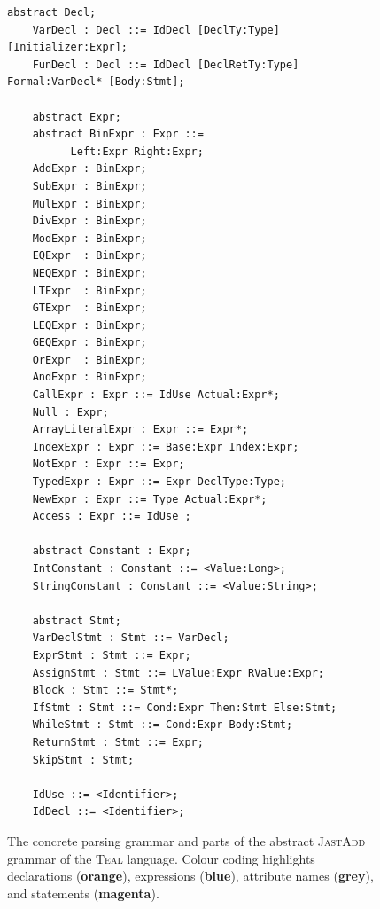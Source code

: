 \begin{figure}[H]
\begin{minipage}{0.8\textwidth}
\begin{lrbox}{\mylistingbox}
\begin{lstlisting}[language=ASTGrammar]
    abstract Decl;
    VarDecl : Decl ::= IdDecl [DeclTy:Type] [Initializer:Expr];
    FunDecl : Decl ::= IdDecl [DeclRetTy:Type] Formal:VarDecl* [Body:Stmt];

    abstract Expr;
    abstract BinExpr : Expr ::=
          Left:Expr Right:Expr;
    AddExpr : BinExpr;
    SubExpr : BinExpr;
    MulExpr : BinExpr;
    DivExpr : BinExpr;
    ModExpr : BinExpr;
    EQExpr  : BinExpr;
    NEQExpr : BinExpr;
    LTExpr  : BinExpr;
    GTExpr  : BinExpr;
    LEQExpr : BinExpr;
    GEQExpr : BinExpr;
    OrExpr  : BinExpr;
    AndExpr : BinExpr;
    CallExpr : Expr ::= IdUse Actual:Expr*;
    Null : Expr;
    ArrayLiteralExpr : Expr ::= Expr*;
    IndexExpr : Expr ::= Base:Expr Index:Expr;
    NotExpr : Expr ::= Expr;
    TypedExpr : Expr ::= Expr DeclType:Type;
    NewExpr : Expr ::= Type Actual:Expr*;
    Access : Expr ::= IdUse ;

    abstract Constant : Expr;
    IntConstant : Constant ::= <Value:Long>;
    StringConstant : Constant ::= <Value:String>;

    abstract Stmt;
    VarDeclStmt : Stmt ::= VarDecl;
    ExprStmt : Stmt ::= Expr;
    AssignStmt : Stmt ::= LValue:Expr RValue:Expr;
    Block : Stmt ::= Stmt*;
    IfStmt : Stmt ::= Cond:Expr Then:Stmt Else:Stmt;
    WhileStmt : Stmt ::= Cond:Expr Body:Stmt;
    ReturnStmt : Stmt ::= Expr;
    SkipStmt : Stmt;

    IdUse ::= <Identifier>;
    IdDecl ::= <Identifier>;
        \end{lstlisting}
\end{lrbox}
\scalebox{0.75}{\usebox{\mylistingbox}}

        \end{minipage}
\caption{\label{fig:tealGrammar} The concrete parsing grammar and parts of the abstract \textsc{JastAdd} grammar of the \textsc{Teal} language.
 Colour coding highlights declarations ({\bfseries\color{orange}orange}), expressions ({\bfseries\color{lightblue}blue}),
 attribute names ({\bfseries\color{CadetBlue}grey}), and statements ({\bfseries\color{magenta}magenta}).}
\end{figure}


